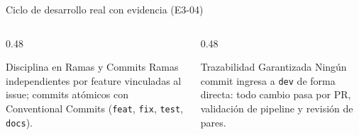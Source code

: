 \begin{frame}{Ciclo de desarrollo real con evidencia (E3-04)}
\begin{columns}[T,onlytextwidth]
\begin{column}{0.48\textwidth}
\begin{block}{Disciplina en Ramas y Commits}
\scriptsize Ramas independientes por feature vinculadas al issue; commits atómicos con Conventional Commits (\texttt{feat}, \texttt{fix}, \texttt{test}, \texttt{docs}).
\end{block}
\end{column}
\begin{column}{0.48\textwidth}
\begin{block}{Trazabilidad Garantizada}
\scriptsize Ningún commit ingresa a \texttt{dev} de forma directa: todo cambio pasa por PR, validación de pipeline y revisión de pares.
\end{block}
\end{column}
\end{columns}
\end{frame}


